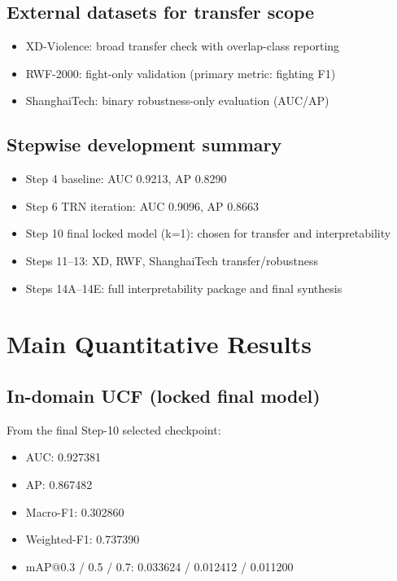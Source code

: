\documentclass[11pt]{article}
\begin{document}
\subsection{External datasets for transfer scope}
\begin{itemize}
  \item XD-Violence: broad transfer check with overlap-class reporting
  \item RWF-2000: fight-only validation (primary metric: fighting F1)
  \item ShanghaiTech: binary robustness-only evaluation (AUC/AP)
\end{itemize}

\subsection{Stepwise development summary}
\begin{itemize}
  \item Step 4 baseline: AUC 0.9213, AP 0.8290
  \item Step 6 TRN iteration: AUC 0.9096, AP 0.8663
  \item Step 10 final locked model (k=1): chosen for transfer and interpretability
  \item Steps 11--13: XD, RWF, ShanghaiTech transfer/robustness
  \item Steps 14A--14E: full interpretability package and final synthesis
\end{itemize}

\section{Main Quantitative Results}
\subsection{In-domain UCF (locked final model)}
From the final Step-10 selected checkpoint:
\begin{itemize}
  \item AUC: 0.927381
  \item AP: 0.867482
  \item Macro-F1: 0.302860
  \item Weighted-F1: 0.737390
  \item mAP@0.3 / 0.5 / 0.7: 0.033624 / 0.012412 / 0.011200
\end{itemize}
\end{document}
